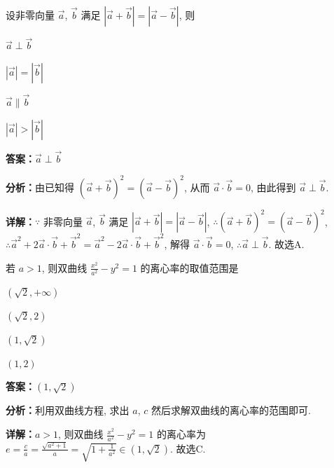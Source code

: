 \begin{question}[points=5]
设非零向量 $\vec{a}$, $\vec{b}$ 满足 $|\vec{a}+\vec{b}|=|\vec{a}-\vec{b}|$, 则
\begin{choices}
  \item $\vec{a}\perp\vec{b}$
  \item $|\vec{a}|=|\vec{b}|$
  \item $\vec{a}\parallel\vec{b}$
  \item $|\vec{a}|>|\vec{b}|$
\end{choices}
\begin{solution}
\textbf{答案：}$\vec{a}\perp\vec{b}$

\textbf{分析：}由已知得 $(\vec{a}+\vec{b})^2=(\vec{a}-\vec{b})^2$, 从而 $\vec{a}\cdot\vec{b}=0$, 由此得到 $\vec{a}\perp\vec{b}$.

\textbf{详解：}$\because$ 非零向量 $\vec{a}$, $\vec{b}$ 满足 $|\vec{a}+\vec{b}|=|\vec{a}-\vec{b}|$, $\therefore (\vec{a}+\vec{b})^2=(\vec{a}-\vec{b})^2$, $\therefore \vec{a}^2+2\vec{a}\cdot\vec{b}+\vec{b}^2=\vec{a}^2-2\vec{a}\cdot\vec{b}+\vec{b}^2$, 解得 $\vec{a}\cdot\vec{b}=0$, $\therefore \vec{a}\perp\vec{b}$. 故选A.
\end{solution}
\end{question}

\begin{question}[points=5]
若 $a>1$, 则双曲线 $\frac{x^2}{a^2}-y^2=1$ 的离心率的取值范围是
\begin{choices}
  \item $(\sqrt{2},+\infty)$
  \item $(\sqrt{2},2)$
  \item $(1,\sqrt{2})$
  \item $(1,2)$
\end{choices}
\begin{solution}
\textbf{答案：}$(1,\sqrt{2})$

\textbf{分析：}利用双曲线方程, 求出 $a$, $c$ 然后求解双曲线的离心率的范围即可.

\textbf{详解：}$a>1$, 则双曲线 $\frac{x^2}{a^2}-y^2=1$ 的离心率为 $e=\frac{c}{a}=\frac{\sqrt{a^2+1}}{a}=\sqrt{1+\frac{1}{a^2}}\in(1,\sqrt{2})$. 故选C.
\end{solution}
\end{question}

